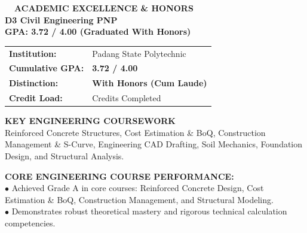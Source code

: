 \documentclass[10pt,a4paper,landscape]{article}
\begin{document}
\noindent
\begin{minipage}[t]{0.30\linewidth}
  \vspace{0pt}
  \begin{tcolorbox}[sharp corners, boxrule=0.8pt, colframe=pborder, colback=white, left=3mm, right=3mm, top=2.5mm, bottom=2.5mm, height=100mm]
    \colorbox{pred}{\fontsize{7pt}{8pt}\selectfont\bfseries\color{white}\ \ ACADEMIC EXCELLENCE \& HONORS\ \ }\\[1.5mm]
    {\fontsize{9.5pt}{11.5pt}\selectfont\bfseries\color{pnavy}D3 Civil Engineering PNP}\\[0.5mm]
    {\fontsize{7pt}{8.5pt}\selectfont\bfseries\color{pred}GPA: 3.72 / 4.00 (Graduated With Honors)}\\[2mm]

    \begin{tcolorbox}[sharp corners, boxrule=0.5pt, colframe=pborder, colback=pbglight, left=2mm, right=2mm, top=1.5mm, bottom=1.5mm]
      \begin{tabularx}{\linewidth}{@{}p{22mm} X@{}}
        {\fontsize{6.8pt}{8pt}\selectfont\bfseries Institution:} & {\fontsize{6.8pt}{8pt}\selectfont Padang State Polytechnic} \\[0.8mm]
        {\fontsize{6.8pt}{8pt}\selectfont\bfseries Cumulative GPA:} & {\fontsize{6.8pt}{8pt}\selectfont\bfseries\color{pred} 3.72 / 4.00} \\[0.8mm]
        {\fontsize{6.8pt}{8pt}\selectfont\bfseries Distinction:} & {\fontsize{6.8pt}{8pt}\selectfont\bfseries With Honors (Cum Laude)} \\[0.8mm]
        {\fontsize{6.8pt}{8pt}\selectfont\bfseries Credit Load:} & {\fontsize{6.8pt}{8pt}\selectfont 115 Credits Completed}
      \end{tabularx}
    \end{tcolorbox}
    \vspace{1.5mm}

    {\fontsize{7.5pt}{9pt}\selectfont\bfseries\color{pnavy}KEY ENGINEERING COURSEWORK}\\[0.8mm]
    {\fontsize{6.5pt}{8.2pt}\selectfont\color{psteel}
    Reinforced Concrete Structures, Cost Estimation \& BoQ, Construction Management \& S-Curve, Engineering CAD Drafting, Soil Mechanics, Foundation Design, and Structural Analysis.
    }
  \end{tcolorbox}
  \vspace{2mm}

  \begin{tcolorbox}[sharp corners, boxrule=0.6pt, colframe=pnavy, colback=pbglight, left=2.5mm, right=2.5mm, top=2mm, bottom=2mm, height=52mm]
    {\fontsize{7pt}{8.5pt}\selectfont\bfseries\color{pnavy}CORE ENGINEERING COURSE PERFORMANCE:}\\[1.5mm]
    {\fontsize{6.5pt}{8.2pt}\selectfont\color{psteel}
    $\bullet$ Achieved Grade A in core courses: Reinforced Concrete Design, Cost Estimation \& BoQ, Construction Management, and Structural Modeling.\\
    $\bullet$ Demonstrates robust theoretical mastery and rigorous technical calculation competencies.
    }
  \end{tcolorbox}
\end{minipage}%
\end{document}
